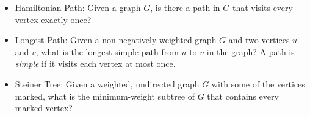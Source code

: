 \begin{itemize}
	\item Hamiltonian Path: Given a graph $G$, is there a path in $G$ that visits every vertex exactly once?
	\item Longest Path: Given a non-negatively weighted graph $G$ and two vertices $u$ and $v$, what is the longest simple path from $u$ to $v$ in the graph? A path is \emph{simple} if it visits each vertex at most once.
	\item Steiner Tree: Given a weighted, undirected graph $G$ with some of the vertices marked, what is the minimum-weight subtree of $G$ that contains every marked vertex?
\end{itemize}